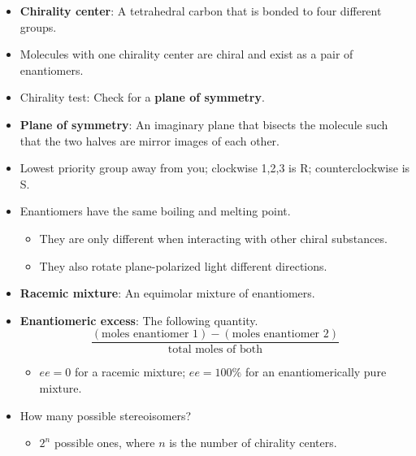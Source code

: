 \documentclass[../notes.tex]{subfiles}
\begin{document}
\begin{itemize}
\begin{itemize}
    \end{itemize}
    \item \textbf{Chirality center}: A tetrahedral carbon that is bonded to four different groups.
    \item Molecules with one chirality center are chiral and exist as a pair of enantiomers.
    \item Chirality test: Check for a \textbf{plane of symmetry}.
    \item \textbf{Plane of symmetry}: An imaginary plane that bisects the molecule such that the two halves are mirror images of each other.
    \item Lowest priority group away from you; clockwise 1,2,3 is R; counterclockwise is S.
    \item Enantiomers have the same boiling and melting point.
    \begin{itemize}
        \item They are only different when interacting with other chiral substances.
        \item They also rotate plane-polarized light different directions.
    \end{itemize}
    \item \textbf{Racemic mixture}: An equimolar mixture of enantiomers.
    \item \textbf{Enantiomeric excess}: The following quantity.
    \begin{equation*}
        \frac{(\text{moles enantiomer 1})-(\text{moles enantiomer 2})}{\text{total moles of both}}
    \end{equation*}
    \begin{itemize}
        \item $ee=0$ for a racemic mixture; $ee=100\%$ for an enantiomerically pure mixture.
    \end{itemize}
    \item How many possible stereoisomers?
    \begin{itemize}
        \item $2^n$ possible ones, where $n$ is the number of chirality centers.
    \end{itemize}
\end{itemize}
\end{document}

